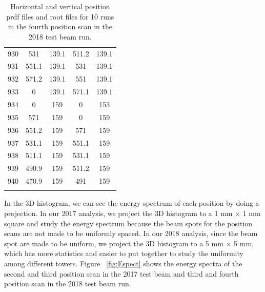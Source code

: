 \documentclass[hidelinks,11pt]{article}
\numberwithin{figure}{section}
\numberwithin{table}{section}
\begin{document}
\begin{table}[h]
\begin{tabular}{|c|c|c|c|c|}
930  & 531  &  139.1 &			511.2  &  139.1 \\ 
931  & 551.1  &  139.1 &			531  &  139.1 \\ 
932  & 571.2  &  139.1 &			551  &  139.1 \\ 
933  & 0  &  139.1 &			571.1  &  139.1 \\ 
934  & 0  &  159 &			0  &  153 \\ 
935  & 571  &  159 &			0  &  159 \\ 
936  & 551.2  &  159 &			571  &  159 \\ 
937  & 531.1  &  159 &			551.1  &  159 \\ 
938  & 511.1  &  159 &			531.1  &  159 \\ 
939  & 490.9  &  159 &			511.2  &  159 \\ 
940  & 470.9  &  159 &			491  &  159 \\ 
\fi
\hline
\end{tabular}
\caption{Horizontal and vertical position prdf files and root files for 10 runs in the fourth position scan in the 2018 test beam run.}
\label{tab:rootvsprdf}
\end{table}

\noindent In the 3D histogram, we can see the energy spectrum of each position by doing a projection. In our 2017 analysis, we project the 3D histogram to a 1 mm $\times$ 1 mm square and study the energy spectrum because the beam spots for the position scans are not made to be uniformly spaced. In our 2018 analysis, since the beam spot are made to be uniform, we  project the 3D histogram to a 5 mm $\times$ 5 mm, which has more statistics and easier to put together to study the uniformity among different towers. Figure ~\ref{fig:Espect} shows the energy spectra of the second and third position scan in the 2017 test beam and third and fourth position scan in the 2018 test beam run. 
\end{document}
